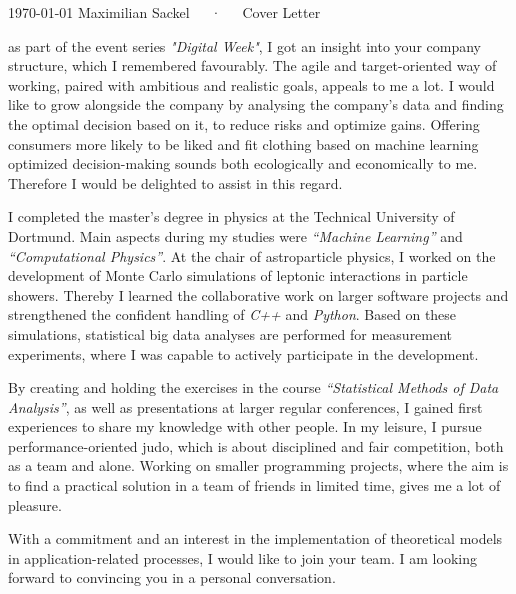 \documentclass[11pt, a4paper]{Awesome-CV/awesome-cv}
\begin{document}
\makecvheader[R]

\makecvfooter
{\today}
{Maximilian Sackel~~~·~~~Cover Letter}
{}

\makelettertitle

\begin{cvletter}
    as part of the event series \textit{"Digital Week"}, I got an insight into your company structure,
    which I remembered favourably.
    The agile and target-oriented way of working,
    paired with ambitious and realistic goals,
    appeals to me a lot.
    I would like to grow alongside the company by analysing the company's data
    and finding the optimal decision based on it, to reduce risks and optimize gains.
    Offering consumers more likely to be liked and fit clothing based on machine learning optimized decision-making sounds both ecologically and economically to me.
    Therefore I would be delighted to assist in this regard.

    I completed the master's degree in physics at the Technical University of Dortmund.
    Main aspects during my studies were \textit{``Machine Learning''} and \textit{``Computational Physics''}.
    At the chair of astroparticle physics, I worked on the development of Monte Carlo simulations of leptonic interactions in particle showers.
    Thereby I learned the collaborative work on larger software projects and strengthened the confident handling of \textit{C++} and \textit{Python}.
    Based on these simulations, statistical big data analyses are performed for measurement experiments,
    where I was capable to actively participate in the development.

    By creating and holding the exercises in the course
    \textit{``Statistical Methods of Data Analysis''}, as well as
    presentations at larger regular conferences,
    I gained first experiences to share my knowledge with other people.
    In my leisure, I pursue performance-oriented judo, which is about disciplined and fair competition, both as a team and alone.
    Working on smaller programming projects, where the aim is to find a
    practical solution in a team of friends in limited time, gives me a lot of
    pleasure.

    With a commitment and an interest in the implementation of
    theoretical models in application-related processes, I would like to join
    your team.
    I am looking forward to convincing you in a personal conversation.

\end{cvletter}


\makeletterclosing
\end{document}

